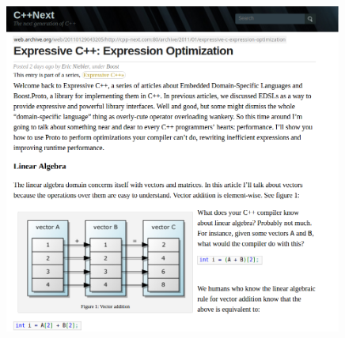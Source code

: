 \documentclass[xcolor=dvipsnames]{beamer}
\begin{document}
\begin{frame}[plain]
  \begin{columns}[T] %
    \begin{column}{0.8\textwidth}
      \begin{figure}[H]
        \centering
        \includegraphics[width=0.99\textwidth]{niebler}
      \end{figure}
    \end{column}%
  \end{columns}
\end{frame}
\end{document}
